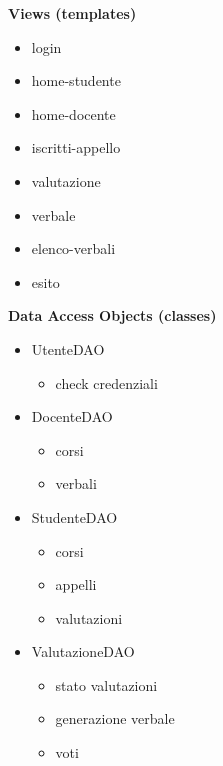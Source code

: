 \documentclass[a4paper,12pt]{scrreprt}
\begin{document}
\begin{minipage}[t]{0.48\textwidth}
\textbf{Views (templates)}
\begin{itemize}
    \item login
    \item home-studente
    \item home-docente
    \item iscritti-appello
    \item valutazione
    \item verbale
    \item elenco-verbali
    \item esito
\end{itemize}
\textbf{Data Access Objects (classes)}
\begin{itemize}
    \item UtenteDAO
    \begin{itemize}
            \item check credenziali 
    \end{itemize}
    \item DocenteDAO
    \begin{itemize}
            \item corsi
            \item verbali
    \end{itemize}
    \item StudenteDAO
    \begin{itemize}
            \item corsi
            \item appelli
            \item valutazioni
        \end{itemize}
    \item ValutazioneDAO
    \begin{itemize}
            \item stato valutazioni
            \item generazione verbale
            \item voti
    \end{itemize}
\end{itemize}
\end{minipage}
\end{document}
